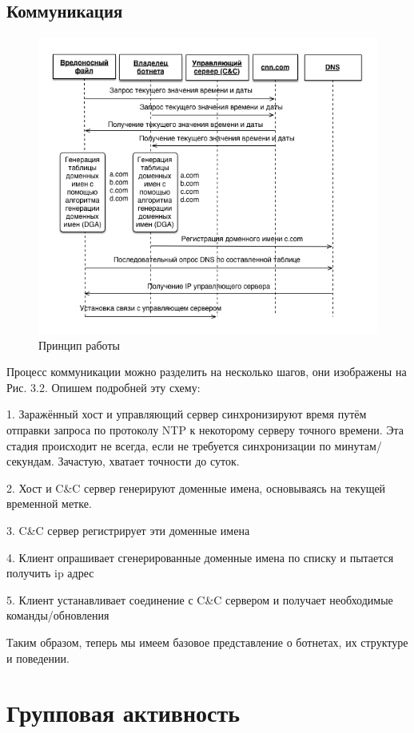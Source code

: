 \documentclass[14pt]{extreport}
\begin{document}
   \section{Коммуникация}
   \begin{figure}[H]
   	\centering
	\includegraphics[scale=0.8]{communicate.png}
	\caption{Принцип работы}
	\end{figure}
	Процесс коммуникации можно разделить на несколько шагов, они изображены на Рис. 3.2. Опишем подробней эту схему:
	
	1. Заражённый хост и управляющий сервер синхронизируют время путём отправки запроса по протоколу NTP к некоторому серверу точного времени. Эта стадия происходит не всегда, если не требуется синхронизации по минутам/секундам. Зачастую, хватает точности до суток.
	
	2. Хост и C\&C сервер генерируют доменные имена, основываясь на текущей временной метке.
	
	3. C\&C сервер регистрирует эти доменные имена
	
	4. Клиент опрашивает сгенерированные доменные имена по списку и пытается получить ip адрес
	
	5. Клиент устанавливает соединение с C\&C сервером и получает необходимые команды/обновления
	
Таким образом, теперь мы имеем базовое представление о ботнетах, их структуре и поведении.

	\chapter{Групповая активность}
	\label{chap:groupact}
\end{document}
